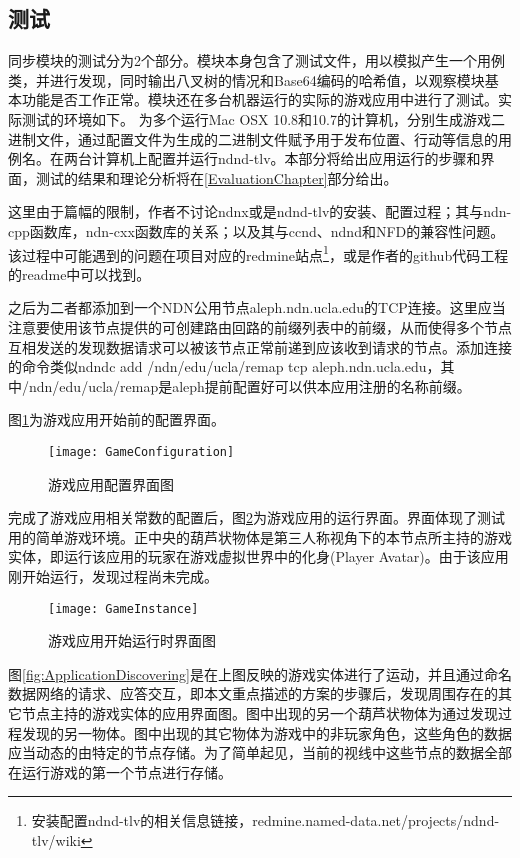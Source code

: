 \subsection{测试}
\label{TestResults}
\par
同步模块的测试分为2个部分。模块本身包含了测试文件，用以模拟产生一个用例类，并进行发现，同时输出八叉树的情况和Base64编码的哈希值，以观察模块基本功能是否工作正常。模块还在多台机器运行的实际的游戏应用中进行了测试。实际测试的环境如下。
为多个运行Mac OSX 10.8和10.7的计算机，分别生成游戏二进制文件，通过配置文件为生成的二进制文件赋予用于发布位置、行动等信息的用例名。在两台计算机上配置并运行ndnd-tlv。本部分将给出应用运行的步骤和界面，测试的结果和理论分析将在\ref{EvaluationChapter}部分给出。
\par
这里由于篇幅的限制，作者不讨论ndnx或是ndnd-tlv的安装、配置过程；其与ndn-cpp函数库，ndn-cxx函数库的关系；以及其与ccnd、ndnd和NFD的兼容性问题。该过程中可能遇到的问题在项目对应的redmine站点\footnote{安装配置ndnd-tlv的相关信息链接，redmine.named-data.net/projects/ndnd-tlv/wiki}，或是作者的github代码工程的readme中可以找到。
\par
之后为二者都添加到一个NDN公用节点aleph.ndn.ucla.edu的TCP连接。这里应当注意要使用该节点提供的可创建路由回路的前缀列表中的前缀，从而使得多个节点互相发送的发现数据请求可以被该节点正常前递到应该收到请求的节点。添加连接的命令类似ndndc add /ndn/edu/ucla/remap tcp aleph.ndn.ucla.edu，其中/ndn/edu/ucla/remap是aleph提前配置好可以供本应用注册的名称前缀。
\par
图\ref{fig:ApplicationConfiguration}为游戏应用开始前的配置界面。
\begin{figure}[h!]
	\centering
	\texttt{[image: GameConfiguration]}
	\caption{游戏应用配置界面图}
	\label{fig:ApplicationConfiguration}
\end{figure}
\par
完成了游戏应用相关常数的配置后，图\ref{fig:ApplicationRunning}为游戏应用的运行界面。界面体现了测试用的简单游戏环境。正中央的葫芦状物体是第三人称视角下的本节点所主持的游戏实体，即运行该应用的玩家在游戏虚拟世界中的化身(Player Avatar)。由于该应用刚开始运行，发现过程尚未完成。
\begin{figure}[h!]
	\centering
	\texttt{[image: GameInstance]}
	\caption{游戏应用开始运行时界面图}
	\label{fig:ApplicationRunning}
\end{figure}
\par
图\ref{fig:ApplicationDiscovering}是在上图反映的游戏实体进行了运动，并且通过命名数据网络的请求、应答交互，即本文重点描述的方案的步骤后，发现周围存在的其它节点主持的游戏实体的应用界面图。图中出现的另一个葫芦状物体为通过发现过程发现的另一物体。图中出现的其它物体为游戏中的非玩家角色，这些角色的数据应当动态的由特定的节点存储。为了简单起见，当前的视线中这些节点的数据全部在运行游戏的第一个节点进行存储。
